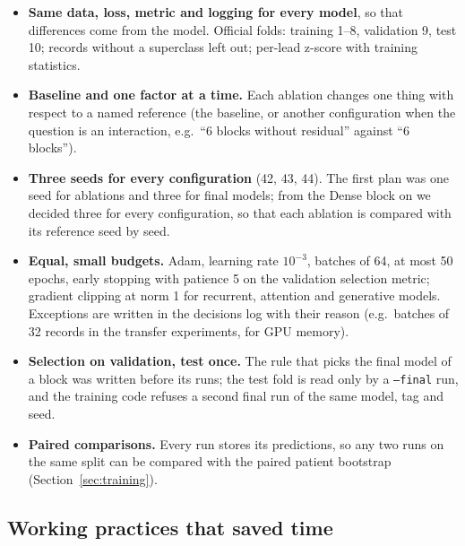 \begin{itemize}[leftmargin=1.2em,itemsep=1pt]
  \item \textbf{Same data, loss, metric and logging for every model}, so that differences come from the
        model. Official folds: training 1--8, validation 9, test 10; records without a superclass left
        out; per-lead z-score with training statistics.
  \item \textbf{Baseline and one factor at a time.} Each ablation changes one thing with respect to a
        named reference (the baseline, or another configuration when the question is an interaction, e.g.\
        ``6 blocks without residual'' against ``6 blocks'').
  \item \textbf{Three seeds for every configuration} (42, 43, 44). The first plan was one seed for ablations
        and three for final models; from the Dense block on we decided three for every configuration, so
        that each ablation is compared with its reference seed by seed.
  \item \textbf{Equal, small budgets.} Adam, learning rate $10^{-3}$, batches of 64, at most 50 epochs,
        early stopping with patience 5 on the validation selection metric; gradient clipping at norm 1
        for recurrent, attention and generative models. Exceptions are written in the decisions log with
        their reason (e.g.\ batches of 32 records in the transfer experiments, for GPU memory).
  \item \textbf{Selection on validation, test once.} The rule that picks the final model of a block was
        written before its runs; the test fold is read only by a \texttt{--final} run, and the training
        code refuses a second final run of the same model, tag and seed.
  \item \textbf{Paired comparisons.} Every run stores its predictions, so any two runs on the same split
        can be compared with the paired patient bootstrap (Section~\ref{sec:training}).
\end{itemize}

\subsection{Working practices that saved time}

